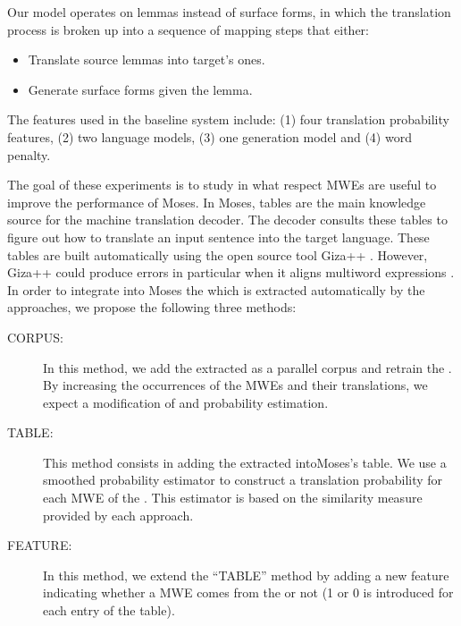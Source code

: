 \documentclass[output=paper,modfonts,nonflat]{langsci/langscibook}
\begin{document}
Our model operates on lemmas instead of surface forms, in which the translation process is broken up into a sequence of mapping steps that either:
\begin{itemize}
\item Translate source lemmas into target's ones.
\item Generate surface forms given the lemma.
\end{itemize}


The features used in the baseline system include: (1) four translation probability features, (2) two language models, (3) one generation model and (4) word penalty. %

The goal of these experiments is to study in what respect MWEs are useful to improve the performance of Moses. In Moses,  tables are the main knowledge source for the machine translation decoder. The decoder consults these tables to figure out how to translate an input sentence into the target language. These tables are built automatically using the open source  tool Giza++ \citep{och2000improved}. However, Giza++ could produce errors in particular when it aligns multiword expressions \citep{fraser2007measuring}. In order to integrate into Moses the  which is extracted automatically by the  approaches, we propose the following three methods:
\begin{description}
\item[CORPUS:] In this method, we add the extracted  as a parallel corpus and retrain the . By increasing the occurrences of the MWEs and their translations, we expect a modification of  and probability estimation.
 \item[TABLE:] This method consists in adding the extracted  into\linebreak Moses’s  table. We use a smoothed probability estimator to construct a translation probability for each MWE of the . This estimator is based on the similarity measure provided by each  approach.
 \item[FEATURE:] In this method, we extend the ``TABLE'' method by adding a new feature indicating whether a MWE comes from the  or not (1 or 0 is introduced for each entry of the  table).
\end{description}
\end{document}
